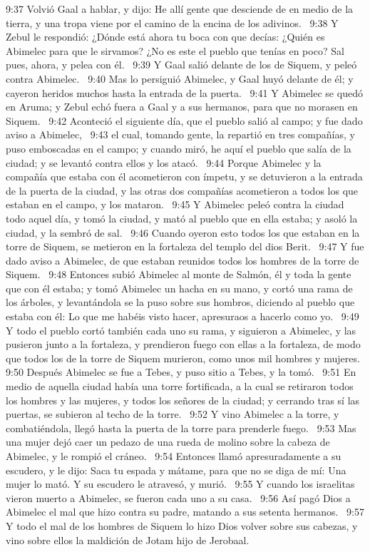 9:37 Volvió Gaal a hablar, y dijo: He allí gente que desciende de en medio de la tierra, y una tropa viene por el camino de la encina de los adivinos.  
9:38 Y Zebul le respondió: ¿Dónde está ahora tu boca con que decías: ¿Quién es Abimelec para que le sirvamos? ¿No es este el pueblo que tenías en poco? Sal pues, ahora, y pelea con él.  
9:39 Y Gaal salió delante de los de Siquem, y peleó contra Abimelec.  
9:40 Mas lo persiguió Abimelec, y Gaal huyó delante de él; y cayeron heridos muchos hasta la entrada de la puerta.  
9:41 Y Abimelec se quedó en Aruma; y Zebul echó fuera a Gaal y a sus hermanos, para que no morasen en Siquem.  
9:42 Aconteció el siguiente día, que el pueblo salió al campo; y fue dado aviso a Abimelec,  
9:43 el cual, tomando gente, la repartió en tres compañías, y puso emboscadas en el campo; y cuando miró, he aquí el pueblo que salía de la ciudad; y se levantó contra ellos y los atacó.  
9:44 Porque Abimelec y la compañía que estaba con él acometieron con ímpetu, y se detuvieron a la entrada de la puerta de la ciudad, y las otras dos compañías acometieron a todos los que estaban en el campo, y los mataron.  
9:45 Y Abimelec peleó contra la ciudad todo aquel día, y tomó la ciudad, y mató al pueblo que en ella estaba; y asoló la ciudad, y la sembró de sal.  
9:46 Cuando oyeron esto todos los que estaban en la torre de Siquem, se metieron en la fortaleza del templo del dios Berit.  
9:47 Y fue dado aviso a Abimelec, de que estaban reunidos todos los hombres de la torre de Siquem.  
9:48 Entonces subió Abimelec al monte de Salmón, él y toda la gente que con él estaba; y tomó Abimelec un hacha en su mano, y cortó una rama de los árboles, y levantándola se la puso sobre sus hombros, diciendo al pueblo que estaba con él: Lo que me habéis visto hacer, apresuraos a hacerlo como yo.  
9:49 Y todo el pueblo cortó también cada uno su rama, y siguieron a Abimelec, y las pusieron junto a la fortaleza, y prendieron fuego con ellas a la fortaleza, de modo que todos los de la torre de Siquem murieron, como unos mil hombres y mujeres.  
9:50 Después Abimelec se fue a Tebes, y puso sitio a Tebes, y la tomó.  
9:51 En medio de aquella ciudad había una torre fortificada, a la cual se retiraron todos los hombres y las mujeres, y todos los señores de la ciudad; y cerrando tras sí las puertas, se subieron al techo de la torre.  
9:52 Y vino Abimelec a la torre, y combatiéndola, llegó hasta la puerta de la torre para prenderle fuego.  
9:53 Mas una mujer dejó caer un pedazo de una rueda de molino sobre la cabeza de Abimelec, y le rompió el cráneo.  
9:54 Entonces llamó apresuradamente a su escudero, y le dijo: Saca tu espada y mátame, para que no se diga de mí: Una mujer lo mató. Y su escudero le atravesó, y murió.  
9:55 Y cuando los israelitas vieron muerto a Abimelec, se fueron cada uno a su casa.  
9:56 Así pagó Dios a Abimelec el mal que hizo contra su padre, matando a sus setenta hermanos.  
9:57 Y todo el mal de los hombres de Siquem lo hizo Dios volver sobre sus cabezas, y vino sobre ellos la maldición de Jotam hijo de Jerobaal.  
